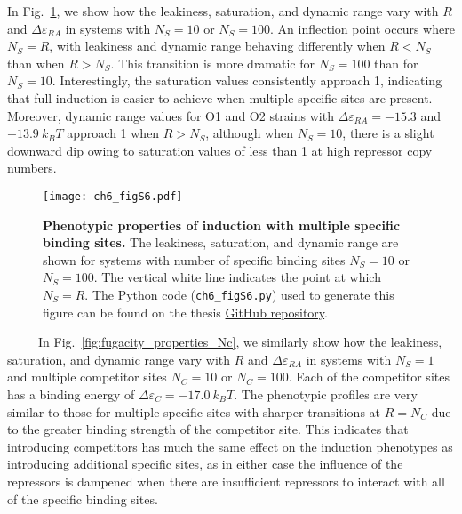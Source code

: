 \documentclass[12pt]{caltech_thesis}
\begin{document}
In Fig.~\ref{fig:fugacity_properties_Ns}, we show how the leakiness,
saturation, and dynamic range vary with \(R\) and
\(\Delta \varepsilon_{RA}\) in systems with \(N_S =10\) or
\(N_S = 100\). An inflection point occurs where \(N_S = R\), with
leakiness and dynamic range behaving differently when \(R < N_S\) than
when \(R > N_S\). This transition is more dramatic for \(N_S = 100\)
than for \(N_S = 10\). Interestingly, the saturation values consistently
approach 1, indicating that full induction is easier to achieve when
multiple specific sites are present. Moreover, dynamic range values for
O1 and O2 strains with \(\Delta \varepsilon_{RA} = -15.3\) and
\(-13.9~k_B T\) approach 1 when \(R > N_S\), although when \(N_S = 10\),
there is a slight downward dip owing to saturation values of less than 1
at high repressor copy numbers.

\hypertarget{fig:fugacity_properties_Ns}{%
\begin{figure}
\centering
\texttt{[image: ch6\_figS6.pdf]}
\caption[{Phenotypic properties of induction with multiple specific
binding sites.}]{\textbf{Phenotypic properties of induction with
multiple specific binding sites.} The leakiness, saturation, and dynamic
range are shown for systems with number of specific binding sites
\(N_S = 10\) or \(N_S = 100\). The vertical white line indicates the
point at which \(N_S = R\). The
\href{https://github.com/gchure/phd/blob/master/src/chapter_06/code/ch6_figS6.py}{Python
code (\texttt{ch6\_figS6.py})} used to generate this figure can be found
on the thesis \href{https://github.com/gchure/phd}{GitHub repository}.}
\label{fig:fugacity_properties_Ns}
\end{figure}
}

~~~~~In Fig.~\ref{fig:fugacity_properties_Nc}, we similarly show how the
leakiness, saturation, and dynamic range vary with \(R\) and
\(\Delta \varepsilon_{RA}\) in systems with \(N_S =1\) and multiple
competitor sites \(N_C = 10\) or \(N_C = 100\). Each of the competitor
sites has a binding energy of \(\Delta \varepsilon_C = -17.0~k_BT\). The
phenotypic profiles are very similar to those for multiple specific
sites with sharper transitions at \(R = N_C\) due to the greater binding
strength of the competitor site. This indicates that introducing
competitors has much the same effect on the induction phenotypes as
introducing additional specific sites, as in either case the influence
of the repressors is dampened when there are insufficient repressors to
interact with all of the specific binding sites.
\end{document}
